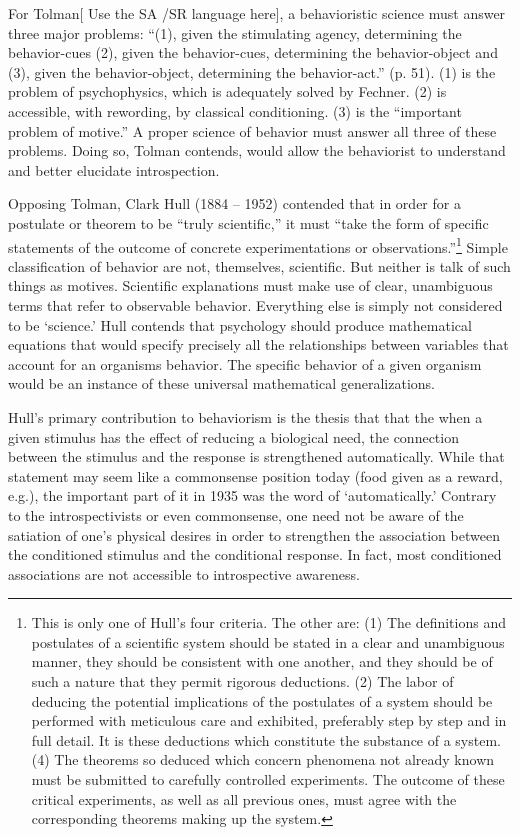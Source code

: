 For Tolman[ Use the SA \slash  SR language here], a behavioristic science must answer three major problems: ``(1), given the stimulating agency, determining the behavior-cues (2), given the behavior-cues, determining the behavior-object and (3), given the behavior-object, determining the behavior-act.'' (p. 51). (1) is the problem of psychophysics, which is adequately solved by Fechner. (2) is accessible, with rewording, by classical conditioning. (3) is the ``important problem of motive.'' A proper science of behavior must answer all three of these problems. Doing so, Tolman contends, would allow the behaviorist to understand and better elucidate introspection.

Opposing Tolman, Clark Hull (1884 – 1952) contended that in order for a postulate or theorem to be ``truly scientific,'' it must ``take the form of specific statements of the outcome of concrete experimentations or observations.''\footnote{This is only one of Hull's four criteria. The other are: (1) The definitions and postulates of a scientific system should be stated in a clear and unambiguous manner, they should be consistent with one another, and they should be of such a nature that they permit rigorous deductions. (2) The labor of deducing the potential implications of the postulates of a system should be performed with meticulous care and exhibited, preferably step by step and in full detail. It is these deductions which constitute the substance of a system. (4) The theorems so deduced which concern phenomena not already known must be submitted to carefully controlled experiments. The outcome of these critical experiments, as well as all previous ones, must agree with the corresponding theorems making up the system.} Simple classification of behavior are not, themselves, scientific. But neither is talk of such things as motives. Scientific explanations must make use of clear, unambiguous terms that refer to observable behavior. Everything else is simply not considered to be `science.' Hull contends that psychology should produce mathematical equations that would specify precisely all the relationships between variables that account for an organisms behavior. The specific behavior of a given organism would be an instance of these universal mathematical generalizations.

Hull's primary contribution to behaviorism is the thesis that that the when a given stimulus has the effect of reducing a biological need, the connection between the stimulus and the response is strengthened automatically. While that statement may seem like a commonsense position today (food given as a reward, e.g.), the important part of it in 1935 was the word of `automatically.' Contrary to the introspectivists or even commonsense, one need not be aware of the satiation of one's physical desires in order to strengthen the association between the conditioned stimulus and the conditional response. In fact, most conditioned associations are not accessible to introspective awareness.

